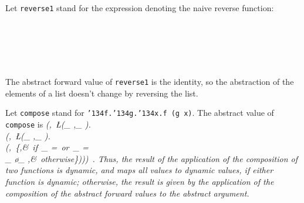 \documentclass[11pt]{article}
\begin{document}
Let \mbox{\tt reverse1} stand for the expression denoting the naive reverse
function:
\begin{flushleft}
\vspace{-0.0em}\vspace{-0.0em}\\
\vspace{-0.0em}\\
\vspace{-0.0em}\\
\vspace{-0.0em}\\
\vspace{-0.0em}
\end{flushleft}
The abstract forward value of \mbox{\tt reverse1} is the identity, so the
abstraction of the elements of a list doesn't change by reversing the
list.

Let \mbox{\tt compose} stand for \mbox{\tt {\char'134}f.{\char'134}g.{\char'134}x.f\ (g\ x)}.  The abstract value of \mbox{\tt compose} is
\beqs
\it (\ID,\ \L(\A_{ },\K_{ }).\\
\it (\ID,\ \L(\A_{ },\K_{ }).\\
\it (\ID,\ \left\{\bot,&\it \mbox{\rm\ if}\ \A_{ }=\BOT\mbox{\rm\ or}\ \A_{ }=\BOT\\
\it \K_{ }\o\K_{ },&\it \mbox{\rm\ otherwise}\ea\right\})))\ .
\eeqs
Thus, the
result of the application of the composition of two functions is
dynamic, and maps all values to dynamic values, if either function is
dynamic; otherwise, the result is given by the application of the
composition of the abstract forward values to the abstract argument.
\end{document}
